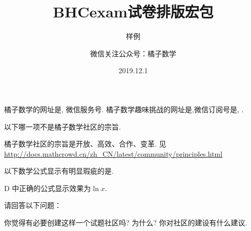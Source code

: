 \documentclass[answers]{BHCexam}
\begin{document}
\title{BHCexam试卷排版宏包}

\subtitle{样例}


\author{微信关注公众号：橘子数学}

\date{2019.12.1}

\maketitle

\begin{groups}

\begin{questions}[s]

\question[30] 橘子数学的网址是, 微信服务号.
\question[30] 橘子数学趣味挑战的网址是,微信订阅号是, .

\end{questions}

\begin{questions}[ps]

\question[30] 以下哪一项不是橘子数学社区的宗旨.

\begin{solution}{4cm}
\method 橘子数学社区的宗旨是开放、高效、合作、变革.
\method 见 \url{http://docs.mathcrowd.cn/zh_CN/latest/community/principles.html}
\end{solution}

\question[40] 以下数学公式显示有明显瑕疵的是.

\begin{solution}{4cm}
\methodonly D 中正确的公式显示效果为$\ln{x}$.
\end{solution}
\end{questions}

\begin{questions}[st]
\question[30] 请回答以下问题：
\begin{subquestions}
    \subquestion 你觉得有必要创建这样一个试题社区吗? 为什么?
    \subquestion 你对社区的建设有什么建议.
\end{subquestions}


\end{questions}
\end{groups}
\end{document}
